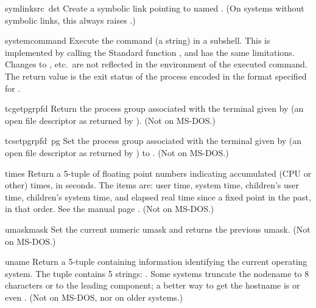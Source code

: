 \begin{funcdesc}{symlink}{src\, dst}
Create a symbolic link pointing to  named .  (On
systems without symbolic links, this always raises .)
\end{funcdesc}

\begin{funcdesc}{system}{command}
Execute the command (a string) in a subshell.  This is implemented by
calling the Standard \C{} function , and has the
same limitations.  Changes to , 
etc.\ are not reflected in the environment of the executed command.
The return value is the exit status of the process encoded in the
format specified for .
\end{funcdesc}

\begin{funcdesc}{tcgetpgrp}{fd}
Return the process group associated with the terminal given by
 (an open file descriptor as returned by ).
(Not on MS-DOS.)
\end{funcdesc}

\begin{funcdesc}{tcsetpgrp}{fd\, pg}
Set the process group associated with the terminal given by
 (an open file descriptor as returned by )
to .
(Not on MS-DOS.)
\end{funcdesc}

\begin{funcdesc}{times}{}
Return a 5-tuple of floating point numbers indicating accumulated (CPU
or other)
times, in seconds.  The items are: user time, system time, children's
user time, children's system time, and elapsed real time since a fixed
point in the past, in that order.  See the \UNIX{}
manual page .  (Not on MS-DOS.)
\end{funcdesc}

\begin{funcdesc}{umask}{mask}
Set the current numeric umask and returns the previous umask.
(Not on MS-DOS.)
\end{funcdesc}

\begin{funcdesc}{uname}{}
Return a 5-tuple containing information identifying the current
operating system.  The tuple contains 5 strings:
.  Some systems truncate the nodename to 8
characters or to the leading component; a better way to get the
hostname is %
or even
%
.
(Not on MS-DOS, nor on older \UNIX{} systems.)
\end{funcdesc}

